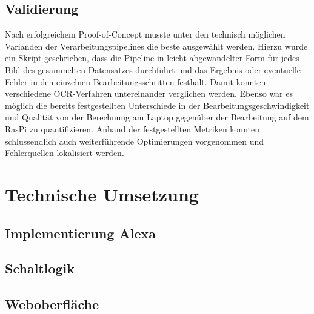 \section{Validierung}
Nach erfolgreichem Proof-of-Concept musste unter den technisch möglichen Varianden der Verarbeitungspipelines die beste ausgewählt werden. Hierzu wurde ein Skript geschrieben, dass die Pipeline in leicht abgewandelter Form für jedes Bild des gesammelten Datensatzes durchführt und das Ergebnis oder eventuelle Fehler in den einzelnen Bearbeitungsschritten festhält. Damit konnten verschiedene OCR-Verfahren untereinander verglichen werden. Ebenso war es möglich die bereits festgestellten Unterschiede in der Bearbeitungsgeschwindigkeit und Qualität von der Berechnung am Laptop gegenüber der Bearbeitung auf dem RasPi zu quantifizieren. Anhand der festgestellten Metriken konnten schlussendlich auch weiterführende Optimierungen vorgenommen und Fehlerquellen lokalisiert werden.


\chapter{Technische Umsetzung}

\section{Implementierung Alexa}
\section{Schaltlogik}
\section{Weboberfläche}


